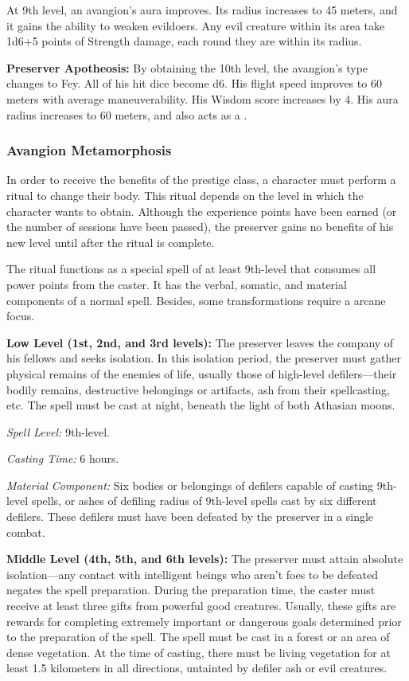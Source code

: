 {At 9th level, an avangion's aura improves. Its radius increases to 45 meters, and it gains the ability to weaken evildoers. Any evil creature within its area take 1d6+5 points of Strength damage, each round they are within its radius.

\textbf{Preserver Apotheosis:} By obtaining the 10th level, the avangion's type changes to Fey. All of his hit dice become d6. His flight speed improves to 60 meters with average maneuverability. His Wisdom score increases by 4. His aura radius increases to 60 meters, and also acts as a .

\subsubsection{Avangion Metamorphosis}
\label{Avangion Metamorphosis}

In order to receive the benefits of the prestige class, a character must perform a ritual to change their body. This ritual depends on the level in which the character wants to obtain. Although the experience points have been earned (or the number of sessions have been passed), the preserver gains no benefits of his new level until after the ritual is complete.

The ritual functions as a special spell of at least 9th-level that consumes all power points from the caster. It has the verbal, somatic, and material components of a normal spell. Besides, some transformations require a arcane focus.

\textbf{Low Level (1st, 2nd, and 3rd levels):} The preserver leaves the company of his fellows and seeks isolation. In this isolation period, the preserver must gather physical remains of the enemies of life, usually those of high-level defilers---their bodily remains, destructive belongings or artifacts, ash from their spellcasting, etc. The spell must be cast at night, beneath the light of both Athasian moons.

\textit{Spell Level:} 9th-level.

\textit{Casting Time:} 6 hours.

\textit{Material Component:} Six bodies or belongings of defilers capable of casting 9th-level spells, or ashes of defiling radius of 9th-level spells cast by six different defilers. These defilers must have been defeated by the preserver in a single combat.

\textbf{Middle Level (4th, 5th, and 6th levels):} The preserver must attain absolute isolation---any contact with intelligent beings who aren't foes to be defeated negates the spell preparation. During the preparation time, the caster must receive at least three gifts from powerful good creatures. Usually, these gifts are rewards for completing extremely important or dangerous goals determined prior to the preparation of the spell. The spell must be cast in a forest or an area of dense vegetation. At the time of casting, there must be living vegetation for at least 1.5 kilometers in all directions, untainted by defiler ash or evil creatures.

}
